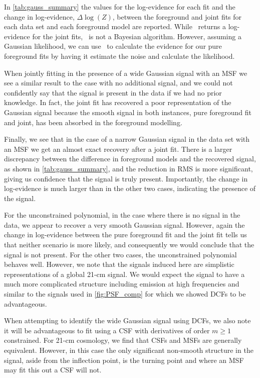 In \cref{tab:gauss_summary} the values for the log-evidence for each fit and the change in log-evidence, $\Delta \log(Z)$, between the foreground and joint fits for each data set and each foreground model are reported. While \multinest~returns a log-evidence for the joint fits, \maxsmooth~is not a Bayesian algorithm. However, assuming a Gaussian likelihood, we can use \multinest~to calculate the evidence for our pure foreground fits by having it estimate the noise and calculate the likelihood.

When jointly fitting in the presence of a wide Gaussian signal with an MSF we see a similar result to the case with no additional signal, and we could not confidently say that the signal is present in the data if we had no prior knowledge. In fact, the joint fit has recovered a poor representation of the Gaussian signal because the smooth signal in both instances, pure foreground fit and joint, has been absorbed in the foreground modelling.

Finally, we see that in the case of a narrow Gaussian signal in the data set with an MSF we get an almost exact recovery after a joint fit. There is a larger discrepancy between the difference in foreground models and the recovered signal, as shown in \cref{tab:gauss_summary}, and the reduction in RMS is more significant, giving us confidence that the signal is truly present. Importantly, the change in log-evidence is much larger than in the other two cases, indicating the presence of the signal.

For the unconstrained polynomial, in the case where there is no signal in the data, we appear to recover a very smooth Gaussian signal. However, again the change in log-evidence between the pure foreground fit and the joint fit tells us that neither scenario is more likely, and consequently we would conclude that the signal is not present. For the other two cases, the unconstrained polynomial behaves well. However, we note that the signals induced here are simplistic representations of a global 21-cm signal. We would expect the signal to have a much more complicated structure including emission at high frequencies and similar to the signals used in \cref{fig:PSF_comp} for which we showed DCFs to be advantageous.

When attempting to identify the wide Gaussian signal using DCFs, we also note it will be advantageous to fit using a CSF with derivatives of order $m \geq 1$ constrained. For 21-cm cosmology, we find that CSFs and MSFs are generally equivalent. However, in this case the only significant non-smooth structure in the signal, aside from the inflection point, is the turning point and where an MSF may fit this out a CSF will not.

